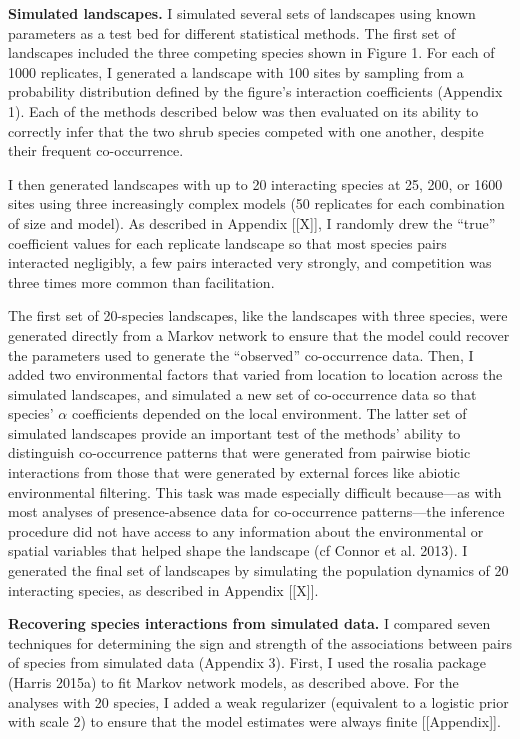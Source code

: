 \documentclass[12pt,]{article}
\begin{document}
\begin{spacing}{1.9}
\begin{flushleft}
\noindent \textbf{Simulated landscapes.} I simulated several sets of
landscapes using known parameters as a test bed for different
statistical methods. The first set of landscapes included the three
competing species shown in Figure 1. For each of 1000 replicates, I
generated a landscape with 100 sites by sampling from a probability
distribution defined by the figure's interaction coefficients (Appendix
1). Each of the methods described below was then evaluated on its
ability to correctly infer that the two shrub species competed with one
another, despite their frequent co-occurrence.

I then generated landscapes with up to 20 interacting species at 25,
200, or 1600 sites using three increasingly complex models (50
replicates for each combination of size and model). As described in
Appendix {[}{[}X{]}{]}, I randomly drew the ``true'' coefficient values
for each replicate landscape so that most species pairs interacted
negligibly, a few pairs interacted very strongly, and competition was
three times more common than facilitation.

The first set of 20-species landscapes, like the landscapes with three
species, were generated directly from a Markov network to ensure that
the model could recover the parameters used to generate the ``observed''
co-occurrence data. Then, I added two environmental factors that varied
from location to location across the simulated landscapes, and simulated
a new set of co-occurrence data so that species' \(\alpha\) coefficients
depended on the local environment. The latter set of simulated
landscapes provide an important test of the methods' ability to
distinguish co-occurrence patterns that were generated from pairwise
biotic interactions from those that were generated by external forces
like abiotic environmental filtering. This task was made especially
difficult because---as with most analyses of presence-absence data for
co-occurrence patterns---the inference procedure did not have access to
any information about the environmental or spatial variables that helped
shape the landscape (cf Connor et al. 2013). I generated the final set
of landscapes by simulating the population dynamics of 20 interacting
species, as described in Appendix {[}{[}X{]}{]}.

\noindent \textbf{Recovering species interactions from simulated data.}
I compared seven techniques for determining the sign and strength of the
associations between pairs of species from simulated data (Appendix 3).
First, I used the rosalia package (Harris 2015a) to fit Markov network
models, as described above. For the analyses with 20 species, I added a
weak regularizer (equivalent to a logistic prior with scale 2) to ensure
that the model estimates were always finite {[}{[}Appendix{]}{]}.


\end{flushleft}
\end{spacing}
\end{document}
